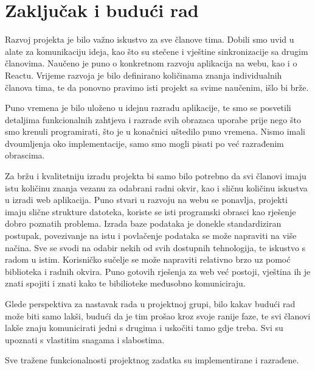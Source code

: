 \chapter{Zaključak i budući rad}

\par Razvoj projekta je bilo važno iskustvo za sve članove tima. Dobili smo uvid u alate za komunikaciju
ideja, kao što su stečene i vještine sinkronizacije sa drugim članovima. Naučeno je puno o konkretnom razvoju
aplikacija na webu, kao i o Reactu. Vrijeme razvoja je bilo definirano količinama znanja individualnih članova tima, 
te da ponovno pravimo isti projekt sa svime naučenim, išlo bi brže.
\par Puno vremena je bilo uloženo u idejnu razradu aplikacije, te smo se posvetili detaljima funkcionalnih
zahtjeva i razrade svih obrazaca uporabe prije nego što smo krenuli programirati, što je u konačnici uštedilo
puno vremena. Nismo imali dvoumljenja oko implementacije, samo smo mogli pisati po već razrađenim
obrascima. 
\par Za bržu i kvalitetniju izradu projekta bi samo bilo potrebno da svi članovi imaju istu količinu
znanja vezanu za odabrani radni okvir, kao i sličnu količinu iskustva u izradi web aplikacija. Puno stvari
u razvoju na webu se ponavlja, projekti imaju slične strukture datoteka, koriste se isti programski obrasci
kao rješenje dobro poznatih problema. Izrada baze podataka je donekle standardiziran postupak, 
povezivanje na istu i povlačenje podataka se može napraviti na više načina. Sve se svodi na odabir nekih od 
svih dostupnih tehnologija, te iskustvo s radom u istim. Korisničko sučelje se može napraviti relativno brzo
uz pomoć biblioteka i radnih okvira. Puno gotovih rješenja za web već postoji, vještina ih je znati spojiti
i znati kako te bibilioteke međusobno komuniciraju. 
\par Glede perspektiva za nastavak rada u projektnoj grupi, bilo kakav budući rad može biti samo lakši,
budući da je tim prošao kroz svoje ranije faze, te svi članovi lakše znaju komunicirati jedni s drugima i 
uskočiti tamo gdje treba. Svi su upoznati s vlastitim snagama i slabostima.
\par Sve tražene funkcionalnosti projektnog zadatka su implementirane i razrađene. 


\eject